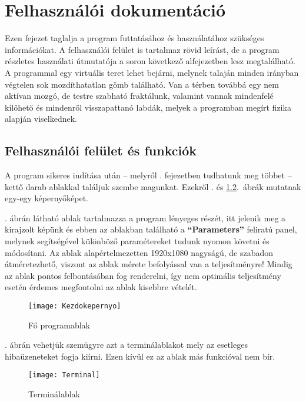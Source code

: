 \chapter{Felhasználói dokumentáció} %
\label{ch:user}

Ezen fejezet taglalja a program futtatásához és használatához szükséges információkat. A felhasználói felület is tartalmaz rövid leírást, de a program részletes használati útmutatója a soron következő alfejezetben lesz megtalálható. A programmal egy virtuális teret lehet bejárni, melynek talaján minden irányban végtelen sok mozdíthatatlan gömb található. Van a térben továbbá egy nem aktívan mozgó, de testre szabható fraktálunk, valamint vannak mindenfelé kilőhető és mindenről visszapattanó labdák, melyek a programban megírt fizika alapján viselkednek.


\section{Felhasználói felület és funkciók} 
\label{sec:ui} 
A program sikeres indítása után -- melyről . fejezetben tudhatunk meg többet -- kettő darab ablakkal találjuk szembe magunkat. Ezekről . és \ref{fig:Terminal}.~ábrák mutatnak egy-egy képernyőképet.

. ábrán látható ablak tartalmazza a program lényeges részét, itt jelenik meg a kirajzolt képünk és ebben az ablakban található a \textbf{``Parameters''} feliratú panel, melynek segítségével különböző paramétereket tudunk nyomon követni és módosítani. Az ablak alapértelmezetten 1920x1080 nagyságú, de szabadon átméretezhető, viszont az ablak mérete befolyással van a teljesítményre! Mindig az ablak pontos felbontásában fog renderelni, így nem optimális teljesítmény esetén érdemes megfontolni az ablak kisebbre vételét.

\begin{figure}[H]
	\centering
	\texttt{[image: Kezdokepernyo]}
	\caption{Fő programablak}
	\label{fig:Kezdokepernyo}
\end{figure}

. ábrán vehetjük szemügyre azt a terminálablakot mely az esetleges hibaüzeneteket fogja kiírni. Ezen kívül ez az ablak más funkcióval nem bír.

\begin{figure}[H]
	\centering
	\texttt{[image: Terminal]}
	\caption{Terminálablak}
	\label{fig:Terminal}
\end{figure}

